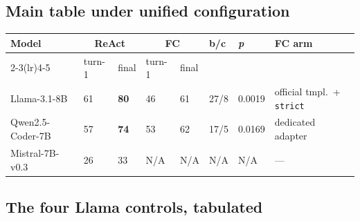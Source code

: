 \subsection{Main table under unified configuration}
\label{sec:maintable_full}

\begin{center}
\begin{minipage}{\linewidth}
\centering
\small
\setlength{\tabcolsep}{4pt}
\label{tab:main}
\setlength{\tabcolsep}{3.5pt}\begin{tabular}{@{}llllllll@{}}
\toprule
Model & \multicolumn{2}{c}{ReAct} & \multicolumn{2}{c}{FC} & b/c & \emph{p} & FC arm \\
\cmidrule(lr){2-3}\cmidrule(lr){4-5}
 & turn-1 & final & turn-1 & final & & & \\
\midrule
Llama-3.1-8B & 61 & \textbf{80} & 46 & 61 & 27/8 & 0.0019 & official tmpl.\ + \texttt{strict} \\
Qwen2.5-Coder-7B & 57 & \textbf{74} & 53 & 62 & 17/5 & 0.0169 & dedicated adapter \\
Mistral-7B-v0.3 & 26 & 33 & N/A & N/A & N/A & N/A & --- \\
\bottomrule
\end{tabular}
\end{minipage}
\end{center}

\subsection{The four Llama controls, tabulated}

